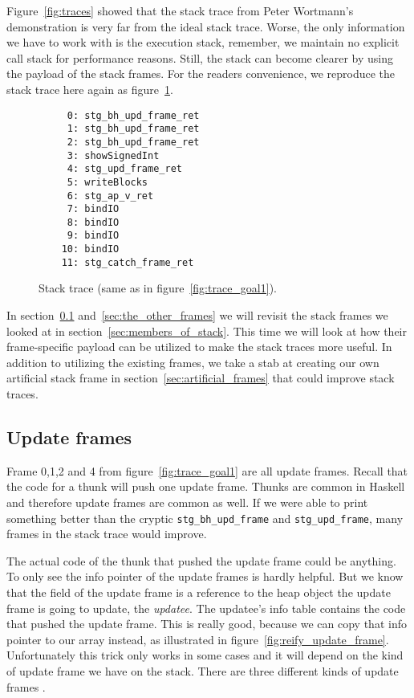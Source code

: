 Figure~\ref{fig:traces} showed that the stack trace from Peter Wortmann's
demonstration is very far from the ideal stack trace.  Worse, the only
information we have to work with is the execution stack, remember, we maintain no
explicit call stack for performance reasons. Still, the stack can become
clearer by using the payload of the stack frames. For the readers convenience,
we reproduce the stack trace here again as figure~\ref{fig:traces_2}.

\begin{figure}
\begin{mdframed}
  \begin{verbatim}
     0: stg_bh_upd_frame_ret
     1: stg_bh_upd_frame_ret
     2: stg_bh_upd_frame_ret
     3: showSignedInt
     4: stg_upd_frame_ret
     5: writeBlocks
     6: stg_ap_v_ret
     7: bindIO
     8: bindIO
     9: bindIO
    10: bindIO
    11: stg_catch_frame_ret
  \end{verbatim}
        \caption{Stack trace (same as in figure~\ref{fig:trace_goal1}).}
        \label{fig:traces_2}
\end{mdframed}
\end{figure}

In section~\ref{sec:update_frames} and~\ref{sec:the_other_frames}
we will revisit the stack frames we looked at in
section~\ref{sec:members_of_stack}. This time we will look at how
their frame-specific payload can be utilized to make the stack
traces more useful. In addition to utilizing the existing frames, we
take a stab at creating our own artificial stack frame in
section~\ref{sec:artificial_frames} that could improve stack traces.

\subsection{Update frames} \label{sec:update_frames}

Frame 0,1,2 and 4 from figure~\ref{fig:trace_goal1} are all update
frames. Recall that the code for a thunk will push one update
frame. Thunks are common in Haskell and therefore update frames are common
as well. If we were able to print something better
than the cryptic \texttt{stg\_bh\_upd\_frame} and \texttt{stg\_upd\_frame},
many frames in the stack trace would improve.

The actual code of the thunk that pushed the update frame
could be anything. To only see the info pointer of the update frames is hardly helpful.
But we know that the field of the update frame is a reference to the
heap object the update frame is going to update, the \emph{updatee}. The updatee's
info table contains the code that pushed the update frame.
This is really good, because we can copy that info pointer to our array instead,
as illustrated in figure~\ref{fig:reify_update_frame}.
Unfortunately this trick only works in some cases and it will depend on the kind of
update frame we have on the stack. There are three different kinds of
update frames \cite{github_updates_cmm}.

